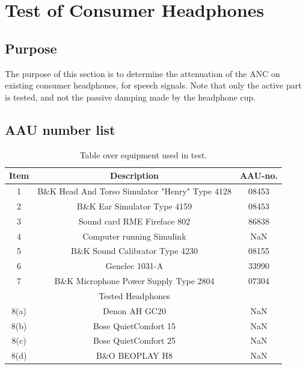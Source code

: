 
\section{Test of Consumer Headphones}
\subsection{Purpose}
The purpose of this section is to determine the attenuation of the ANC on existing consumer headphones, for speech signals. 
Note that only the active part is tested, and not the passive damping made by the headphone cup.


\subsection{AAU number list}
\begin{table}[H]
	\centering
	\begin{tabular}{ c c c } \toprule
	{Item}	&	{Description} 								& {AAU-no}. \\ 
								\bottomrule 
		1	&	B\&K Head And Torso Simulator "Henry" Type 4128	& 08453	\\
		2	&	B\&K Ear Simulator Type 4159				& 08453		\\
		3	&	Sound card RME Fireface 802					& 86838		\\
		4	&	Computer running Simulink					& NaN		\\
		5	&	B\&K Sound Calibrator Type 4230				& 08155		\\ 
		6	&	Genelec 1031-A								& 33990		\\ 
		7	& 	B\&K Microphone Power Supply Type 2804		& 07304		\\
								\bottomrule
							& Tested Headphones 			& 			\\
								\bottomrule
		8(a)	& Denon AH GC20 								& NaN 		\\
		8(b)	& Bose QuietComfort 15 							& NaN 		\\
		8(c)	& Bose QuietComfort 25						 	& NaN		\\
		8(d)	& B\&O BEOPLAY H8 								& NaN		\\
								\bottomrule
	\end{tabular}
	\caption{Table over equipment used in test.}
	\label{tab:UsedEquipmentListConsumerHP}
\end{table}

